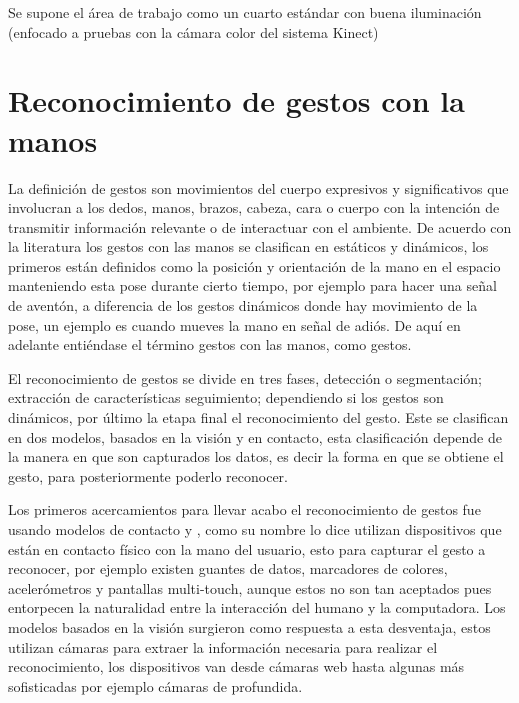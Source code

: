 Se supone el área de trabajo como un cuarto estándar con buena iluminación (enfocado a pruebas con la cámara color del sistema Kinect)

\section{Reconocimiento de gestos con la manos}\label{Reconocimiento de gestos con las mannos} 


La definición de gestos \citep{Mitra2007} son movimientos del cuerpo expresivos y significativos que involucran a los dedos, manos, brazos, cabeza, cara o cuerpo con la intención de transmitir información relevante o de interactuar con el ambiente. De acuerdo con la literatura \citep{Mitra2007} los gestos con las manos se clasifican en estáticos y dinámicos, los primeros están definidos como la posición y orientación de la mano en el espacio manteniendo esta pose durante cierto tiempo, por ejemplo para hacer una se\~nal de aventón, a diferencia de los gestos dinámicos donde hay movimiento de la pose, un ejemplo  es cuando mueves la mano en se\~nal de adiós. De aquí en adelante entiéndase el término gestos con las manos, como gestos. 

El reconocimiento de gestos se divide en tres fases\cite{Rautaray2012}, detección o segmentación; extracci\'on de caracter\'isticas seguimiento; dependiendo si los gestos son dinámicos, por último la etapa final el reconocimiento del gesto.  
Este se clasifican en dos modelos, basados en la visi\'on y en contacto, esta clasificaci\'on depende de la manera en que son capturados los datos, es decir la forma en que se obtiene el gesto, para posteriormente poderlo reconocer. 

Los primeros acercamientos para llevar acabo el reconocimiento de gestos fue usando modelos de contacto \cite{Rautaray2012} y \cite{Nayakwadi2014}, como su nombre lo dice utilizan dispositivos que est\'an en contacto f\'isico con la mano del usuario, esto para capturar el gesto a reconocer, por ejemplo existen guantes de datos, marcadores de colores, acelerómetros y pantallas multi-touch, aunque estos no son tan aceptados pues entorpecen la naturalidad entre la interacción del humano y la computadora. Los modelos basados en la visi\'on surgieron como respuesta a esta desventaja, estos utilizan cámaras para extraer la información necesaria para realizar el reconocimiento, los dispositivos van desde c\'amaras web hasta algunas más sofisticadas por ejemplo c\'amaras de profundida.  

